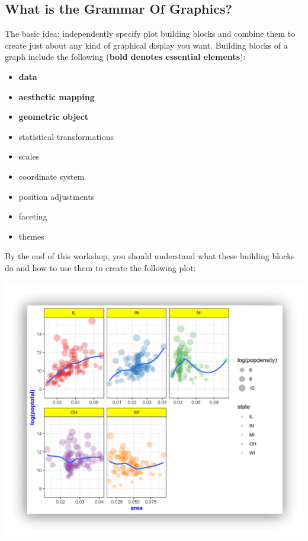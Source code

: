 \documentclass[
]{book}
\providecommand{\tightlist}{%
  \setlength{\itemsep}{0pt}\setlength{\parskip}{0pt}}
\begin{document}
\hypertarget{what-is-the-grammar-of-graphics}{%
\subsection{What is the Grammar Of Graphics?}\label{what-is-the-grammar-of-graphics}}

The basic idea: independently specify plot building blocks and combine them to create just about any kind of graphical display you want. Building blocks of a graph include the following (\textbf{bold denotes essential elements}):

\begin{itemize}
\tightlist
\item
  \textbf{data}
\item
  \textbf{aesthetic mapping}
\item
  \textbf{geometric object}
\item
  statistical transformations
\item
  scales
\item
  coordinate system
\item
  position adjustments
\item
  faceting
\item
  themes
\end{itemize}

By the end of this workshop, you should understand what these building blocks do and how to use them to create the following plot:

\includegraphics{R/Rgraphics/images/final_plot.png}
\end{document}

